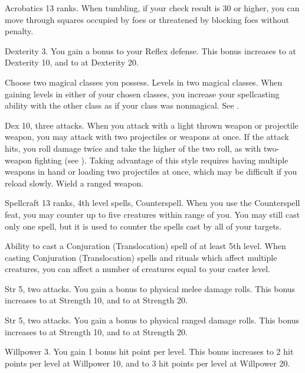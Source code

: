 \featpre Acrobatics 13 ranks.
\featben When tumbling, if your check result is 30 or higher, you can move through squares occupied by foes or threatened by blocking foes without penalty.

\featpre Dexterity 3.
\featben You gain a  bonus to your Reflex defense.
This bonus increases to  at Dexterity 10, and to  at Dexterity 20.

Choose two magical classes you possess.
\featpres
Levels in two magical classes.
\featben When gaining levels in either of your chosen classes, you increase your spellcasting ability with the other class as if your class was nonmagical.
See .

\featpres Dex 10, three attacks.
\featben When you attack with a light thrown weapon or projectile weapon, you may attack with two projectiles or weapons at once.
If the attack hits, you roll damage twice and take the higher of the two roll, as with two-weapon fighting (see ).
Taking advantage of this style requires having multiple weapons in hand or loading two projectiles at once, which may be difficult if you reload slowly.
\stylereq Wield a ranged weapon.

\featpres Spellcraft 13 ranks, 4th level spells, Counterspell.
\featben When you use the Counterspell feat, you may counter up to five creatures within \rngmed range of you.
You may still cast only one spell, but it is used to counter the spells cast by all of your targets.

\featpre Ability to cast a Conjuration (Translocation) spell of at least 5th level.
\featben When casting Conjuration (Translocation) spells and rituals which affect multiple creatures, you can affect a number of creatures equal to your caster level.

\featpres Str 5, two attacks.
\featben You gain a  bonus to physical melee damage rolls.
This bonus increases to  at Strength 10, and to  at Strength 20.

\featpres Str 5, two attacks.
\featben You gain a  bonus to physical ranged damage rolls.
This bonus increases to  at Strength 10, and to  at Strength 20.

\featpre Willpower 3.
\featben You gain 1 bonus hit point per level.
This bonus increases to 2 hit points per level at Willpower 10, and to 3 hit points per level at Willpower 20.

